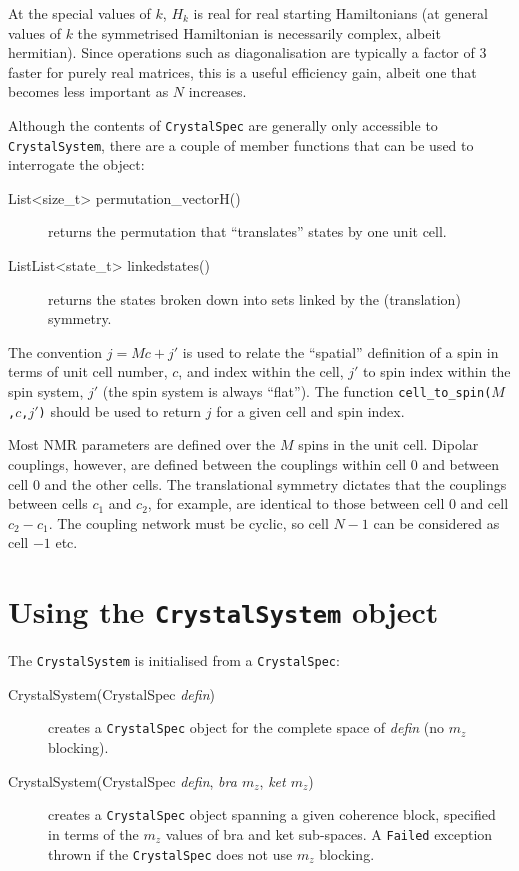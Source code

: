 \documentclass[11pt,a4paper]{article}
\begin{document}
At the special values of $k$, $H_k$ is real for real starting Hamiltonians
(at general values of $k$ the symmetrised Hamiltonian is necessarily complex,
albeit hermitian).  Since operations such as diagonalisation are typically
a factor of 3 faster for purely real matrices, this is a useful efficiency
gain, albeit one that becomes less important as $N$ increases.

Although the contents of {\tt CrystalSpec} are generally only
accessible to {\tt CrystalSystem}, there are a couple of member functions
that can be used to interrogate the object:
\begin{description}
\item[List<size\_t> permutation\_vectorH()] returns the permutation
that ``translates'' states by one unit cell.  
\item[ListList<state\_t> linkedstates()] returns the states broken
down into sets linked by the (translation) symmetry. 
\end{description}

The convention  $j=Mc+j'$ is used to relate the ``spatial'' definition
of a spin in terms of unit cell number, $c$, and index within the cell, $j'$
to spin index
within the spin system, $j'$ (the spin system is always ``flat''). The
function {\tt cell\_to\_spin($M$,$c$,$j'$)} should be used to
return $j$ for a given cell and spin index.

Most NMR parameters are defined over the $M$ spins in the unit cell.
Dipolar couplings, however, are defined between the couplings within cell 0
and between cell 0 and the other cells.  The translational symmetry dictates
that the couplings between cells $c_1$ and $c_2$, for example, are identical
to those between cell 0 and cell $c_2-c_1$.  The coupling network must be
cyclic, so cell $N-1$ can be considered as cell $-1$ etc.

\section{Using the {\tt CrystalSystem} object}

The {\tt CrystalSystem} is initialised from a {\tt CrystalSpec}:
\begin{description}
\item[CrystalSystem(CrystalSpec {\it defin})] creates a {\tt CrystalSpec} object for
the complete space of {\it defin} (no $m_z$ blocking).
\item[CrystalSystem(CrystalSpec {\it defin}, {\it bra $m_z$}, {\it ket $m_z$})]
creates a {\tt CrystalSpec} object spanning a given coherence block, specified
in terms of the $m_z$ values of bra and ket sub-spaces.  A {\tt Failed}
exception thrown if the {\tt CrystalSpec} does not use $m_z$ blocking.
\end{description}
\end{document}
